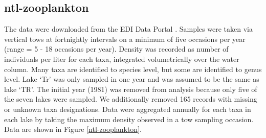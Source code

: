 \documentclass[11pt, oneside]{article}
\begin{document}
\subsection {ntl-zooplankton}
The data were downloaded from the EDI Data Portal \citep{ntl-zooplankton}.
Samples were taken  via vertical tows at fortnightly intervals on a minimum of five occasions per year (range = 5 - 18 occasions per year).
Density was recorded as number of individuals per liter for each taxa, integrated volumetrically over the water column.
Many taxa are identified to species level, but some are identified to genus level.
Lake `Tr'  was only sampled in one year and was assumed to be the same as lake `TR'. %
The initial year (1981) was removed from analysis because only five of the seven lakes were sampled.
We additionally removed 165 records with missing or unknown taxa designations.
Data were aggregated annually for each taxa in each lake by taking the maximum density observed in a tow sampling occasion.
Data are shown in Figure \ref{ntl-zooplankton}.
\end{document}
